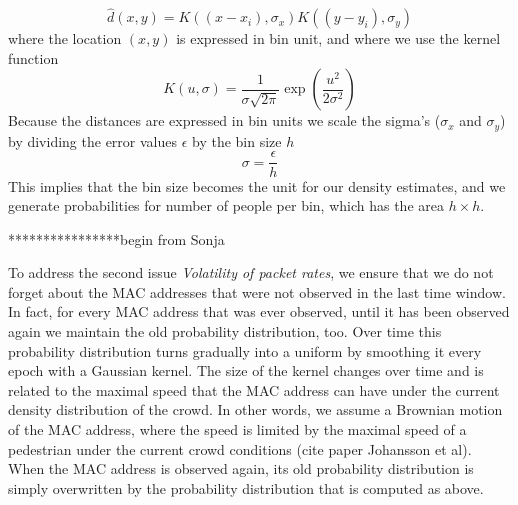 \documentclass[10pt,a4paper]{article}
\begin{document}
\begin{equation}
\hat{d}(x,y)=K((x-x_{i}),\sigma_{x}) K((y-y_{i}),\sigma_{y})
\label{kde}
\end{equation}
where the location $(x,y)$ is expressed in bin unit, and where we use the kernel function
\begin{equation}
K(u,\sigma)=\frac{1}{\sigma\sqrt{2\pi}}\exp(\frac{u^2}{2\sigma^2})
\end{equation}
Because the distances are expressed in bin units we scale the sigma's  ($\sigma_{x}$ and $\sigma_{y}$) by dividing the error values $\epsilon$ by the bin size $h$ 
\begin{equation}
\sigma=\frac{\epsilon}{h}
\end{equation}
This implies that the bin size becomes the unit for our density estimates, and we generate probabilities for number of people per bin, which has the area $h\times h$.

****************begin from Sonja

To address the second issue {\it Volatility of packet rates}, we ensure that we do not forget about the MAC addresses that were not observed in the last time window. In fact, for every MAC address that was ever observed, until it has been observed again we maintain the old probability distribution, too. Over time this probability distribution turns gradually into a uniform by smoothing it every epoch with a Gaussian kernel. The size of the kernel changes over time and is related to the maximal speed that the MAC address can have under the current density distribution of the crowd. In other words, we assume a Brownian motion of the MAC address, where the speed is limited by the maximal speed of a pedestrian under the current crowd conditions (cite paper Johansson et al). When the MAC address is observed again, its old probability distribution is simply overwritten by the probability distribution that is computed as above. 
\end{document}
